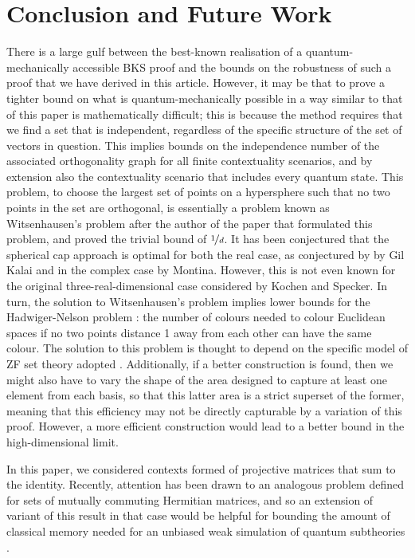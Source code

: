 \documentclass{amsart}
\theoremstyle{definition}
\begin{document}
\section{Conclusion and Future Work}
There is a large gulf between the best-known realisation of a quantum-mechanically accessible BKS proof and the bounds on the robustness of such a proof that we have derived in this article. However, it may be that to prove a tighter bound on what is quantum-mechanically possible in a way similar to that of this paper is mathematically difficult; this is because the method requires that we find a set that is independent, regardless of the specific structure of the set of vectors in question. This implies bounds on the independence number of the associated orthogonality graph for all finite contextuality scenarios, and by extension also the contextuality scenario that includes every quantum state. This problem, to choose the largest set of points on a hypersphere such that no two points in the set are orthogonal, is essentially a problem known as Witsenhausen's problem \cite{Wits1974} after the author of the paper that formulated this problem, and proved the trivial bound of $\nicefrac{1}{d}$. It has been conjectured that the spherical cap approach is optimal for both the real case, as conjectured by \cite{DeCo2015} by Gil Kalai and in the complex case by Montina. However, this is not even known for the original three-real-dimensional case considered by Kochen and Specker. In turn, the solution to Witsenhausen's problem implies lower bounds for the Hadwiger-Nelson problem \cite{DeCo2015}: the number of colours needed to colour Euclidean spaces if no two points distance 1 away from each other can have the same colour. The solution to this problem is thought to depend on the specific model of ZF set theory adopted \cite{Soif2008}. Additionally, if a better construction is found, then we might also have to vary the shape of the area designed to
capture at least one element from each basis, so that this latter area is a strict superset of the
former, meaning that this efficiency may not be directly capturable by a variation of this proof. However, a more efficient construction would lead to a better bound in the high-dimensional limit.

 In this paper, we considered contexts formed of projective matrices that sum to the identity. Recently, attention has been drawn to an analogous problem defined for sets of mutually commuting Hermitian matrices, and so an extension of variant of this result in that case would be helpful for bounding the amount of classical memory needed for an unbiased weak simulation of quantum subtheories \cite{Kara2017}.
 
\end{document}
